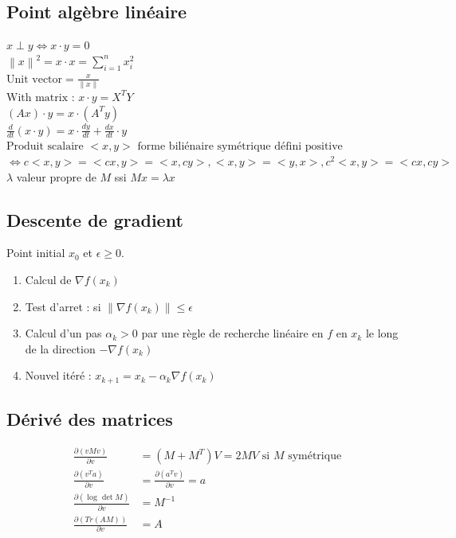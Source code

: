 \documentclass{article}
\theoremstyle{plain}%
\theoremstyle{definition}
\theoremstyle{remark}
\begin{document}
\subsection{Point algèbre linéaire}
$\displaystyle x \perp y \Leftrightarrow x \cdot y = 0 $ \\
$\displaystyle \left\| x \right\| ^2 = x \cdot x = \sum_{i=1}^{n}x_i^2 $ \\ 
$\displaystyle \text{Unit vector} = \frac{x}{\left\| x \right\| } $ \\
$\displaystyle \text{With matrix : } x \cdot y = X^T Y $ \\
$\displaystyle (Ax) \cdot y = x \cdot (A^T y) $ \\
$\displaystyle \frac{d}{dt}(x \cdot y) = x \cdot \frac{dy}{dt} + \frac{dx}{dt}\cdot y $ \\
$\displaystyle \text{Produit scalaire } <x,y> \text{ forme biliénaire symétrique défini positive} $ \\
$\displaystyle \Leftrightarrow c <x, y> = <cx, y> = <x,cy>, <x,y> = <y,x>, c^2 < x,y> = <cx, cy> $ \\
$\displaystyle \lambda  $ valeur propre  de $ M $ ssi $ Mx = \lambda x $ 

\subsection{Descente de gradient}
Point initial $ x_0 $ et $ \epsilon \geq 0 $.
\begin{enumerate}
    \item Calcul de $ \nabla f(x_k) $ 
    \item Test d'arret : si $ \left\| \nabla f(x_k) \right\| \leq \epsilon  $ 
    \item Calcul d'un pas $ \alpha _k > 0 $ par une règle de recherche linéaire en $ f $ en $ x_k $ le long de la direction $ - \nabla f(x_k) $ 
    \item Nouvel itéré : $ x_{k+1} = x_k - \alpha _k \nabla f(x_k) $ 
\end{enumerate}

\subsection{Dérivé des matrices}
\begin{align*}
    \frac{\partial (vMv)}{\partial v} &= (M + M^T)V = 2MV \text{ si } M \text{ symétrique} \\
    \frac{\partial (v^T a)}{\partial v} &= \frac{\partial (a^T v)}{\partial v} = a \\
    \frac{\partial (\log_{} \det M)}{\partial v} &= M^{-1}\\
    \frac{\partial (Tr(AM))}{\partial v} &= A
\end{align*}
\end{document}
